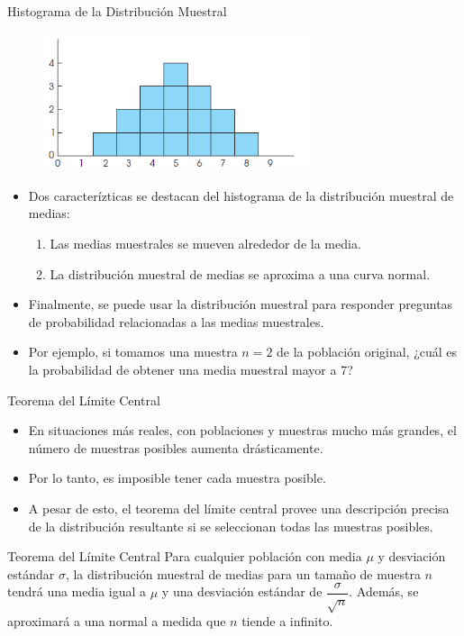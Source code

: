 \documentclass{beamer}
\begin{document}
\begin{frame}{Histograma de la Distribución Muestral}
					\begin{figure}[H]
						\centering  
						\caption{} 
						\includegraphics[width = 0.7\textwidth]{./cap6}
					\end{figure}
\end{frame}
\begin{frame}
	\begin{itemize}
		\justifying
		\item Dos caracterízticas se destacan del histograma de la distribución muestral de medias:
		\begin{enumerate}
			\justifying
			\item Las medias muestrales se mueven alrededor de la media.
			\item La distribución muestral de medias se aproxima a una curva normal.
		\end{enumerate}
		\item Finalmente, se puede usar la distribución muestral para responder preguntas de probabilidad relacionadas a las medias muestrales.
		\item Por ejemplo, si tomamos una muestra $n=2$ de la población original, ¿cuál es la probabilidad de obtener una media muestral mayor a 7?
	\end{itemize}
\end{frame}

\begin{frame}{Teorema del Límite Central}
	\begin{itemize}
		\justifying
		\item En situaciones más reales, con poblaciones y muestras mucho más grandes, el número de muestras posibles aumenta drásticamente.
		\item Por lo tanto, es imposible tener cada muestra posible.
		\item A pesar de esto, el teorema del límite central provee una descripción precisa de la distribución resultante si se seleccionan todas las muestras posibles.
	\end{itemize}
	\begin{block}{Teorema del Límite Central}
		Para cualquier población con media $\mu$ y desviación estándar $\sigma$, la distribución muestral de medias para un tamaño de muestra $n$ tendrá una media igual a $\mu$ y una desviación estándar de $\dfrac{\sigma}{\sqrt{n}}$. Además, se aproximará a una normal a medida que $n$ tiende a infinito.
	\end{block}
\end{frame}
\end{document}

